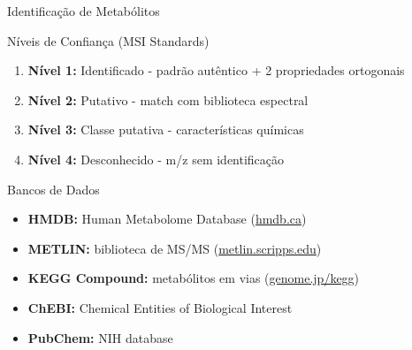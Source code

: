 \begin{frame}{Identificação de Metabólitos}
\begin{block}{Níveis de Confiança (MSI Standards)}
\begin{enumerate}
    \item \textbf{Nível 1:} Identificado - padrão autêntico + 2 propriedades ortogonais
    \item \textbf{Nível 2:} Putativo - match com biblioteca espectral
    \item \textbf{Nível 3:} Classe putativa - características químicas
    \item \textbf{Nível 4:} Desconhecido - m/z sem identificação
\end{enumerate}
\end{block}

\vspace{0.3cm}

\begin{exampleblock}{Bancos de Dados}
\begin{itemize}
    \item \textbf{HMDB:} Human Metabolome Database (\url{hmdb.ca})
    \item \textbf{METLIN:} biblioteca de MS/MS (\url{metlin.scripps.edu})
    \item \textbf{KEGG Compound:} metabólitos em vias (\url{genome.jp/kegg})
    \item \textbf{ChEBI:} Chemical Entities of Biological Interest
    \item \textbf{PubChem:} NIH database
\end{itemize}
\end{exampleblock}
\end{frame}

